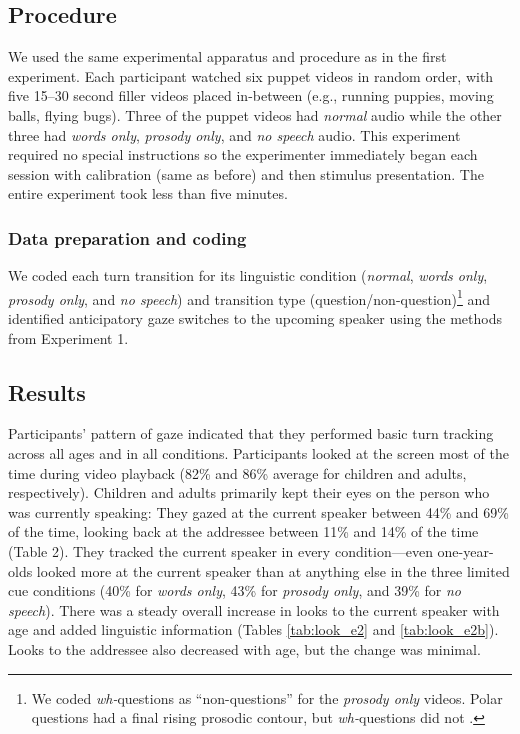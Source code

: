 \documentclass[authoryear, 12pt]{elsarticle}
\begin{document}
\subsection{Procedure}
We used the same experimental apparatus and procedure as in the first experiment. Each participant watched six puppet videos in random order, with five 15--30 second filler videos placed in-between (e.g., running puppies, moving balls, flying bugs). Three of the puppet videos had \textit{normal} audio while the other three had \textit{words only}, \textit{prosody only}, and \textit{no speech} audio. This experiment required no special instructions so the experimenter immediately began each session with calibration (same as before) and then stimulus presentation. The entire experiment took less than five minutes.

\subsubsection{Data preparation and coding}
We coded each turn transition for its linguistic condition (\textit{normal}, \textit{words only}, \textit{prosody only}, and \textit{no speech}) and transition type (question/non-question)\footnote{We coded \textit{wh-}questions as ``non-questions'' for the \textit{prosody only} videos. Polar questions had a final rising prosodic contour, but \textit{wh-}questions did not  \citep{hedberg2010}.} and identified anticipatory gaze switches to the upcoming speaker using the methods from Experiment 1.

\subsection{Results}
\label{sec:results2}

Participants' pattern of gaze indicated that they performed basic turn tracking across all ages and in all conditions. Participants looked at the screen most of the time during video playback (82\% and 86\% average for children and adults, respectively). Children and adults primarily kept their eyes on the person who was currently speaking: They gazed at the current speaker between 44\% and 69\% of the time, looking back at the addressee between 11\% and 14\% of the time (Table 2). They tracked the current speaker in every condition---even one-year-olds looked more at the current speaker than at anything else in the three limited cue conditions (40\% for \textit{words only}, 43\% for \textit{prosody only}, and 39\% for \textit{no speech}). There was a steady overall increase in looks to the current speaker with age and added linguistic information (Tables \ref{tab:look_e2} and \ref{tab:look_e2b}). Looks to the addressee also decreased with age, but the change was minimal. 
\end{document}
